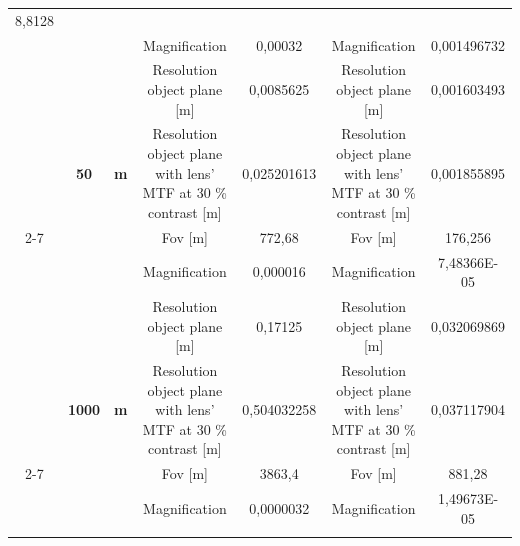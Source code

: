 \begin{table}[H]
{\begin{tabular}{ccc|cc|cc|}
  \cellcolor[HTML]{EFEFEF}8,8128 \\
\multicolumn{1}{|c|}{} &
  \cellcolor[HTML]{EFEFEF} &
  \cellcolor[HTML]{EFEFEF} &
  Magnification &
  0,00032 &
  Magnification &
  0,001496732 \\
\multicolumn{1}{|c|}{} &
  \cellcolor[HTML]{EFEFEF} &
  \cellcolor[HTML]{EFEFEF} &
  \cellcolor[HTML]{EFEFEF}Resolution object plane {[}m{]} &
  \cellcolor[HTML]{EFEFEF}0,0085625 &
  \cellcolor[HTML]{EFEFEF}Resolution object plane {[}m{]} &
  \cellcolor[HTML]{EFEFEF}0,001603493 \\
\multicolumn{1}{|c|}{} &
  \multirow{-4}{*}{\cellcolor[HTML]{EFEFEF}\textbf{50}} &
  \multirow{-4}{*}{\cellcolor[HTML]{EFEFEF}\textbf{m}} &
  Resolution object plane with lens' MTF at 30 \% contrast {[}m{]} &
  0,025201613 &
  Resolution object plane with lens' MTF at 30 \% contrast {[}m{]} &
  0,001855895 \\ \cline{2-7} 
\multicolumn{1}{|c|}{} &
  \cellcolor[HTML]{EFEFEF} &
  \cellcolor[HTML]{EFEFEF} &
  \cellcolor[HTML]{EFEFEF}Fov {[}m{]} &
  \cellcolor[HTML]{EFEFEF}772,68 &
  \cellcolor[HTML]{EFEFEF}Fov {[}m{]} &
  \cellcolor[HTML]{EFEFEF}176,256 \\
\multicolumn{1}{|c|}{} &
  \cellcolor[HTML]{EFEFEF} &
  \cellcolor[HTML]{EFEFEF} &
  Magnification &
  0,000016 &
  Magnification &
  7,48366E-05 \\
\multicolumn{1}{|c|}{} &
  \cellcolor[HTML]{EFEFEF} &
  \cellcolor[HTML]{EFEFEF} &
  \cellcolor[HTML]{EFEFEF}Resolution object plane {[}m{]} &
  \cellcolor[HTML]{EFEFEF}0,17125 &
  \cellcolor[HTML]{EFEFEF}Resolution object plane {[}m{]} &
  \cellcolor[HTML]{EFEFEF}0,032069869 \\
\multicolumn{1}{|c|}{} &
  \multirow{-4}{*}{\cellcolor[HTML]{EFEFEF}\textbf{1000}} &
  \multirow{-4}{*}{\cellcolor[HTML]{EFEFEF}\textbf{m}} &
  Resolution object plane with lens' MTF at 30 \% contrast {[}m{]} &
  0,504032258 &
  Resolution object plane with lens' MTF at 30 \% contrast {[}m{]} &
  0,037117904 \\ \cline{2-7} 
\multicolumn{1}{|c|}{} &
  \cellcolor[HTML]{EFEFEF} &
  \cellcolor[HTML]{EFEFEF} &
  \cellcolor[HTML]{EFEFEF}Fov {[}m{]} &
  \cellcolor[HTML]{EFEFEF}3863,4 &
  \cellcolor[HTML]{EFEFEF}Fov {[}m{]} &
  \cellcolor[HTML]{EFEFEF}881,28 \\
\multicolumn{1}{|c|}{} &
  \cellcolor[HTML]{EFEFEF} &
  \cellcolor[HTML]{EFEFEF} &
  Magnification &
  0,0000032 &
  Magnification &
  1,49673E-05 \\
\multicolumn{1}{|c|}{} &
  \cellcolor[HTML]{EFEFEF} &

\end{tabular}}
\end{table}
